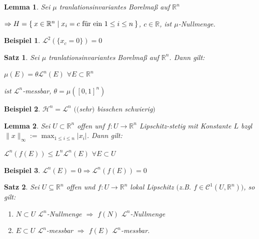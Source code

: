 \documentclass[11pt]{memoir}
\theoremstyle{changebreak}
\newtheorem{Beispiel}{Beispiel}[chapter]
\newtheorem{Lemma}{Lemma}[chapter]
\newtheorem{Satz}{Satz}[chapter]
\begin{document}

\begin{Lemma}
Sei $\mu$ tranlationsinvariantes Borelmaß auf $\mathbb R^n$
\begin{center}
	$\Rightarrow H = \Set{ x \in \mathbb R^n | x_i = c \text{ für ein } 1\leq i \leq n}$, $c \in \mathbb R$, ist $\mu$-Nullmenge.
\end{center}
\end{Lemma}

\begin{Beispiel}
$\mathscr L^2(\{x_c = 0\}) = 0$
\end{Beispiel}

\begin{Satz}
Sei $\mu$ tranlationsinvariantes Borelmaß auf $\mathbb R^n$. Dann gilt:
\begin{center}
	$\mu(E) = \theta \mathscr L^n(E)$ $ \forall E \subset \mathbb R^n$
\end{center}
ist $\mathscr L^n$-messbar, $\theta = \mu([0, 1]^n)$
\end{Satz}

\begin{Beispiel}
$\mathscr H^n = \mathscr L^n$ $(($sehr$)$ bisschen schwierig$)$
\end{Beispiel}

\begin{Lemma}
Sei $U \subset \mathbb R^n$ offen unf $f: U \rightarrow \mathbb R^n$ Lipschitz-stetig mit Konstante $L$ bzgl $\|x\|_\infty := \max_{1 \leq i \leq n} |x_i |$. Dann gilt:
\begin{center}
	$\mathscr L^n(f(E)) \leq L^n \mathscr L^n (E)$ $\forall E \subset U$
\end{center}
\end{Lemma}

\begin{Beispiel}
$\mathscr L^n(E) = 0 \Rightarrow \mathscr L^n(f(E)) = 0$
\end{Beispiel}



\begin{Satz}
Sei $U \subseteq \mathbb R^n$ offen und $f: U \rightarrow \mathbb R^n$ lokal Lipschitz $($z.B. $f \in \mathscr C^1(U, \mathbb R^n))$, so gilt:
\begin{enumerate}
	\item $N \subset U$ $\mathscr L^n$-Nullmenge $\Rightarrow$ $f(N)$ $\mathscr L^n$-Nullmenge
	\item $E \subset U$ $\mathscr L^n$-messbar $\Rightarrow$ $f(E)$ $\mathscr L^n$-messbar.
\end{enumerate}
\end{Satz}
\end{document}
